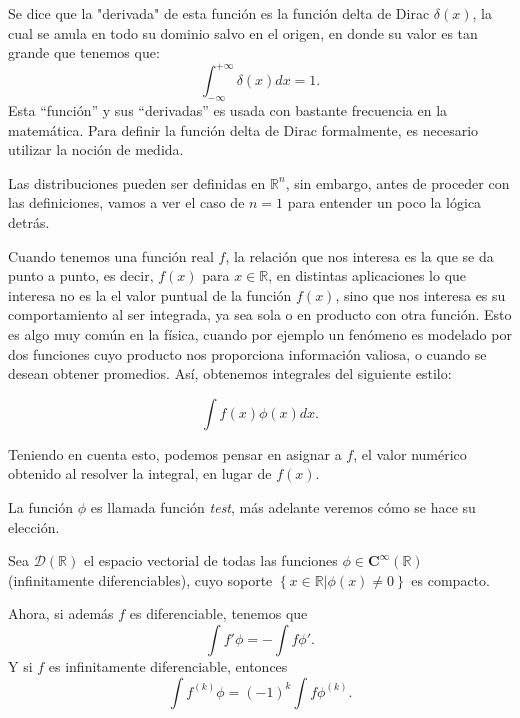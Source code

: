 \documentclass[letter,12pt]{article}
\begin{document}
Se dice que la "derivada" de esta función es la función delta de Dirac $ \delta(x) $, la cual se anula en todo su dominio salvo en el origen, en donde su valor es tan grande que tenemos que:
\begin{equation}
	\int_{-\infty}^{+\infty}\delta(x) dx = 1.
\end{equation} 
Esta ``función'' y sus ``derivadas'' es usada con bastante frecuencia en la matemática.
Para definir la función delta de Dirac formalmente, es necesario utilizar la noción de medida.

Las distribuciones pueden ser definidas en $ \mathbb{R}^n $, sin embargo, antes de proceder con las definiciones, vamos a ver el caso de $ n =1 $ para entender un poco la lógica detrás.

Cuando tenemos una función real $ f $, la relación que nos interesa es la que se da
punto a punto, es decir, $ f(x) $ para $ x \in \mathbb{R} $, 
en distintas aplicaciones lo que interesa no es la el valor puntual de la función 
$ f(x) $, sino que nos interesa es su comportamiento al ser integrada, ya sea sola 
o en producto con otra función. Esto es algo muy común en la física, cuando 
por ejemplo un fenómeno es modelado por dos funciones cuyo producto nos
proporciona información valiosa, o cuando se desean obtener promedios. 
Así, obtenemos integrales del siguiente estilo:

\begin{equation}
	\int{f(x)\phi(x)}dx.
\end{equation}

Teniendo en cuenta esto, podemos pensar en asignar a $ f $, el valor numérico obtenido 
al resolver la integral, en lugar de $ f(x) $.

La función $ \phi $ es llamada función \textit{test}, más adelante veremos cómo se hace 
su elección.

Sea $ \mathscr{D}(\mathbb{R}) $ el espacio vectorial de todas las funciones 
$ \phi \in \mathbf{C}^\infty (\mathbb{R}) $ (infinitamente diferenciables), cuyo soporte
$ \left\{ x\in \mathbb{R}| \phi(x) \neq 0 \right\} $ es compacto.

Ahora, si además $ f $ es diferenciable, tenemos que
\begin{equation}\label{int:first}
	\int{f'\phi} = - \int{f\phi '}.
\end{equation}
Y si $ f $ es infinitamente diferenciable, entonces
\begin{equation}\label{int:second}
	\int{f^{(k)}\phi} = (-1)^k \int{f\phi^{(k)}}.
\end{equation}
\end{document}
